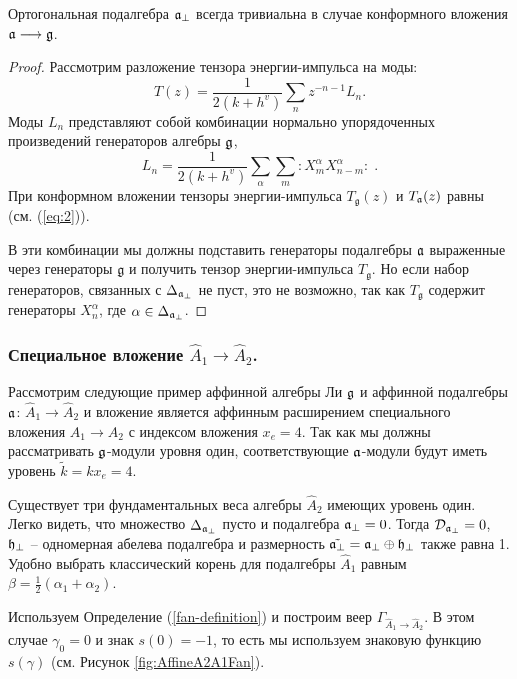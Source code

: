 \begin{mynote} Ортогональная подалгебра  $\mathfrak{a}_{\perp}$ всегда тривиальна в случае конформного вложения $\mathfrak{a}\longrightarrow \mathfrak{g}$.
\begin{proof}
Рассмотрим разложение тензора энергии-импульса на моды:
\begin{equation*}
\label{eq:47}
  T(z)=\frac{1}{2(k+h^v)}\sum_n z^{-n-1}L_n.
\end{equation*}
Моды $L_n$ представляют собой комбинации нормально упорядоченных произведений генераторов алгебры $\mathfrak{g}$,
\begin{equation*}
\label{eq:48}
  L_n=\frac{1}{2(k+h^v)}\sum_{\alpha}\sum_m:X^{\alpha}_m X^{\alpha}_{n-m}: \; .
\end{equation*}
При конформном вложении тензоры энергии-импульса  $T_{\mathfrak{g}}(z)$ и $T_{\mathfrak{a}}(z)$ равны (см. (\ref{eq:2})).

В эти комбинации мы должны подставить генераторы подалгебры $\mathfrak{a}$ выраженные через генераторы $\mathfrak{g}$ и получить тензор энергии-импульса $T_{\mathfrak{g}}$. Но если набор генераторов, связанных с  $\Delta_{\mathfrak{a}_{\perp}}$ не пуст, это не возможно, так как  $T_{\mathfrak{g}}$ содержит генераторы $X^{\alpha}_n$, где $\alpha\in \Delta_{\mathfrak{a}_{\perp}}$.
\end{proof}
\end{mynote}



\subsubsection{Специальное вложение $\hat{A}_1\rightarrow\hat{A}_2$.}
\label{sec:spec-embedd-hata_1s}
Рассмотрим следующие пример аффинной алгебры Ли $\mathfrak{g}$ и аффинной подалгебры $\mathfrak{a}$:
$\hat{A}_1 \rightarrow \hat{A}_2$ и вложение является аффинным расширением специального вложения $A_1 \rightarrow A_2$ с индексом вложения $x_e=4$. Так как мы должны рассматривать $\mathfrak{g}$-модули уровня один, соответствующие  $\mathfrak{a}$-модули будут иметь уровень $\tilde{k}=kx_e=4$.

Существует три фундаментальных веса алгебры  $\hat{A}_2$ имеющих уровень один. 
Легко видеть, что множество $\Delta_{ \mathfrak{a}_{\perp} }$ пусто и подалгебра $\mathfrak{a}_{\perp}=0$. Тогда ${\cal D}_{\mathfrak{a}_{\perp}}=0$, $\mathfrak{h}_{\perp}$ -- одномерная абелева подалгебра и размерность $\tilde{\mathfrak{a}_{\perp}}=\mathfrak{a}_{\perp}\oplus \mathfrak{h}_{\perp}$ также равна 1. Удобно выбрать классический корень для подалгебры $\hat{A}_1$ равным $\beta=\frac{1}{2}(\alpha_1+\alpha_2)$.

Используем Определение (\ref{fan-definition}) и построим веер $\Gamma_{\hat A_1\to\hat A_2}$. В этом случае $\gamma_0 =0$ и знак  $s\left( 0 \right)=-1$, то есть мы используем знаковую функцию $s(\gamma)$ (см. Рисунок \ref{fig:AffineA2A1Fan}).


